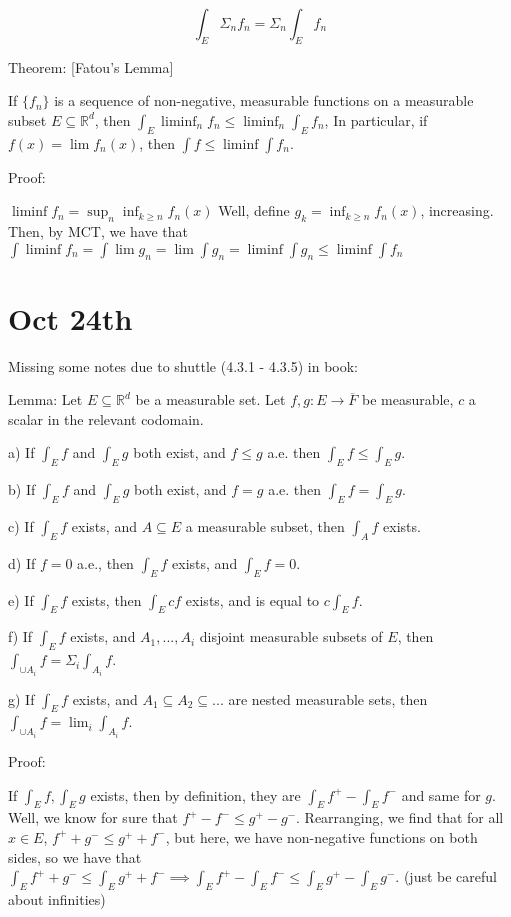 \documentclass[10pt]{article}
\begin{document}
$$ \int_E \Sigma_n f_n = \Sigma_n \int_E f_n$$

Theorem: [Fatou’s Lemma]


If $\{ f_n \}$ is a sequence of non-negative, measurable functions on a measurable subset $E \subseteq \mathbb{R}^d$, then $\int_E \liminf_n f_n \leq \liminf_n \int_E f_n$, In particular, if $f(x) = \lim f_n(x)$, then $\int f \leq \liminf \int f_n$.

Proof:

$\liminf f_n = \sup_n \inf_{k \geq n} f_n(x)$ Well, define $g_k = \inf_{k \geq n} f_n(x)$, increasing. Then, by MCT, we have that $\int \liminf f_n= \int \lim g_n = \lim \int g_n = \liminf \int g_n \leq \liminf \int f_n$

\section*{Oct 24th}

Missing some notes due to shuttle (4.3.1 - 4.3.5) in book:

Lemma: Let $E \subseteq \mathbb{R}^d$ be a measurable set. Let $f,g: E \to \overline{F}$ be measurable, $c$ a scalar in the relevant codomain.

a) If $\int_E f$ and $\int_E g$ both exist, and $f \leq g$ a.e. then $\int_E f \leq \int_E g$.

b) If $\int_E f$ and $\int_E g$ both exist, and $f = g$ a.e. then $\int_E f = \int_E g$.

c) If $\int_E f$ exists, and $A \subseteq E$ a measurable subset, then $\int_A f$ exists.

d) If $f = 0$ a.e., then $\int_E f$ exists, and $\int_E f = 0$.

e) If $\int_E f$ exists, then $\int_E cf$ exists, and is equal to $c \int_E f$.

f) If $\int_E f$ exists, and $A_1,...,A_i$ disjoint measurable subsets of $E$, then $\int_{\cup A_i} f = \Sigma_i \int_{A_i} f$.

g) If $\int_E f$ exists, and $A_1 \subseteq A_2 \subseteq ...$ are nested measurable sets, then $\int_{\cup A_i} f = \lim_i \int_{A_i} f$.

Proof:

If $\int_E f, \int_E g$ exists, then by definition, they are $\int_E f^+ - \int_E f^-$ and same for $g$. Well, we know for sure that $f^+ - f^- \leq g^+ - g^-$. Rearranging, we find that for all $x \in E$, $f^+ + g^- \leq g^+ + f^-$, but here, we have non-negative functions on both sides, so we have that $\int_E f^+ + g^- \leq \int_E g^+ + f^- \implies \int_E f^+ - \int_E f^- \leq \int_E g^+ - \int_E g^-$. (just be careful about infinities)
\end{document}
